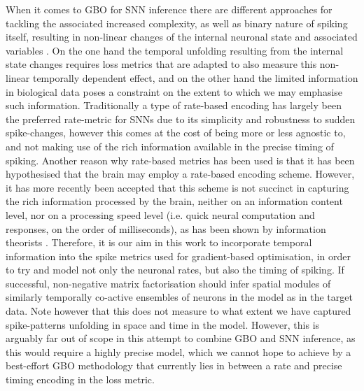 \documentclass[mphil,deptreport,ianc]{infthesis} %
\begin{document}
When it comes to GBO for SNN inference there are different approaches for tackling the associated increased complexity, as well as binary nature of spiking itself, resulting in non-linear changes of the internal neuronal state and associated variables \cite{Jang, Taherkhani2020, Thalmeier2016, Tavanaei2019a, Bellec2019a, Neftci2019, Bohte2002, Nicola2017, Tavanaei2019, Mostafa2018, Goncalves2019}.
On the one hand the temporal unfolding resulting from the internal state changes requires loss metrics that are adapted to also measure this non-linear temporally dependent effect, and on the other hand the limited information in biological data poses a constraint on the extent to which we may emphasise such information.
Traditionally a type of rate-based encoding has largely been the preferred rate-metric for SNNs due to its simplicity and robustness to sudden spike-changes, however this comes at the cost of being more or less agnostic to, and not making use of the rich information available in the precise timing of spiking.
Another reason why rate-based metrics has been used is that it has been hypothesised that the brain may employ a rate-based encoding scheme. However, it has more recently been accepted that this scheme is not succinct in capturing the rich information processed by the brain, neither on an information content level, nor on a processing speed level (i.e. quick neural computation and responses, on the order of milliseconds), as has been shown by information theorists \cite{Brette2015PhilosophyBrain}.
Therefore, it is our aim in this work to incorporate temporal information into the spike metrics used for gradient-based optimisation, in order to try and model not only the neuronal rates, but also the timing of spiking.
If successful, non-negative matrix factorisation should infer spatial modules of similarly temporally co-active ensembles of neurons in the model as in the target data.
Note however that this does not measure to what extent we have captured spike-patterns unfolding in space and time in the model. However, this is arguably far out of scope in this attempt to combine GBO and SNN inference, as this would require a highly precise model, which we cannot hope to achieve by a best-effort GBO methodology that currently lies in between a rate and precise timing encoding in the loss metric.
\end{document}
